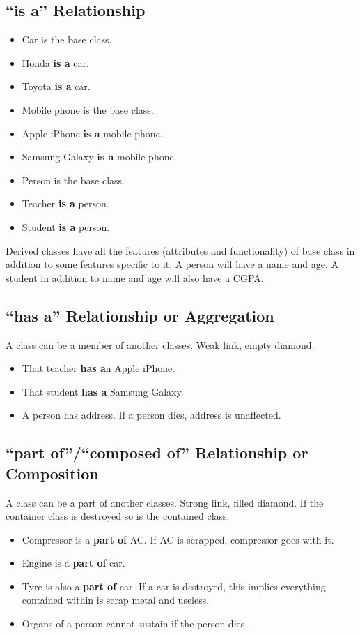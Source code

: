 \documentclass[12pt,a4paper]{article}
\begin{document}
\subsection{``is a'' Relationship}
\begin{itemize}
\item Car is the base class.
\item Honda \textbf{is a} car.
\item Toyota \textbf{is a} car.
\end{itemize}
\begin{itemize}
\item Mobile phone is the base class.
\item Apple iPhone \textbf{is a} mobile phone.
\item Samsung Galaxy \textbf{is a} mobile phone.
\end{itemize}
\begin{itemize}
\item Person is the base class.
\item Teacher \textbf{is a} person.
\item Student \textbf{is a} person.
\end{itemize}
Derived classes have all the features (attributes and functionality) of base class in addition to some features specific to it. A person will have a name and age. A student in addition to name and age will also have a CGPA.
\subsection{``has a'' Relationship or Aggregation}
A class can be a member of another classes. Weak link, empty diamond.
\begin{itemize}
\item That teacher \textbf{has a}n Apple iPhone.
\item That student \textbf{has a} Samsung Galaxy.
\item A person has address. If a person dies, address is unaffected.
\end{itemize}
\subsection{``part of''/``composed of'' Relationship or Composition}
A class can be a part of another classes. Strong link, filled diamond. If the container class is destroyed so is the contained class.
\begin{itemize}
\item Compressor is a \textbf{part of} AC. If AC is scrapped, compressor goes with it.
\item Engine is a \textbf{part of} car. 
\item Tyre is also a \textbf{part of} car. If a car is destroyed, this implies everything contained within is scrap metal and useless.
\item Organs of a person cannot sustain if the person dies.
\end{itemize}
\end{document}
